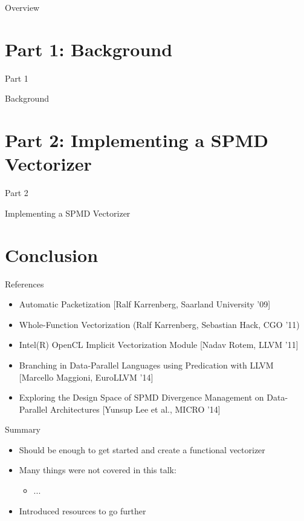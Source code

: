 \documentclass[t,aspectratio=169]{beamer}
\newcommand{\talkpart}[2]{%
\section{Part #1: #2}

\begin{frame}[c]{Part #1}

\vspace{1cm}
\centerline{\LARGE{#2}}

\end{frame}}
\begin{document}

\begin{frame}{Overview}
\tableofcontents
\end{frame}


\talkpart{1}{Background}


\talkpart{2}{Implementing a SPMD Vectorizer}





%


\section*{Conclusion}

\begin{frame}{References}

\begin{itemize}
    \item Automatic Packetization [Ralf Karrenberg, Saarland University '09]
    \item Whole-Function Vectorization (Ralf Karrenberg, Sebastian Hack, CGO '11)
    \item Intel(R) OpenCL Implicit Vectorization Module [Nadav Rotem, LLVM '11]
    \item Branching in Data-Parallel Languages using Predication with LLVM [Marcello Maggioni, EuroLLVM '14]
    \item Exploring the Design Space of SPMD Divergence Management on Data-Parallel Architectures [Yunsup Lee et al., MICRO '14]
\end{itemize}

\end{frame}


\begin{frame}{Summary}

\begin{itemize}
    \item Should be enough to get started and create a functional vectorizer
    \item Many things were not covered in this talk:
    \begin{itemize}
        \item ...
    \end{itemize}
    \item Introduced resources to go further
\end{itemize}

\end{frame}
\end{document}
